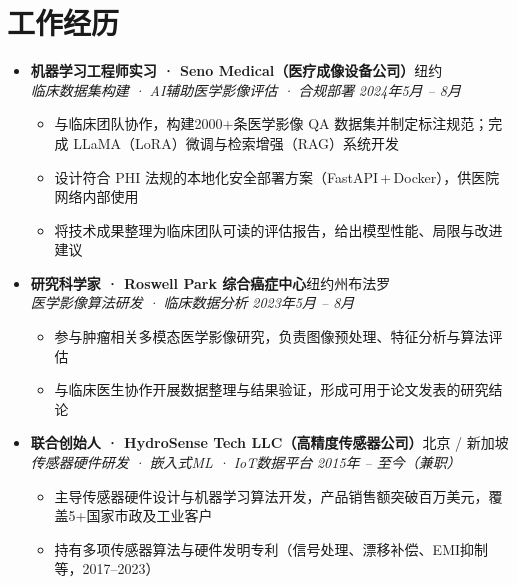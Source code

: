 \documentclass[letterpaper,10pt]{article}
\begin{document}
\vspace{-2pt}

\section{工作经历}

\begin{itemize}[leftmargin=0in, label={}]

  \item
  \textbf{机器学习工程师实习 · Seno Medical（医疗成像设备公司）}\hfill 纽约 \\
  \textit{临床数据集构建 · AI辅助医学影像评估 · 合规部署} \hfill \textit{2024年5月 -- 8月}
  \begin{itemize}[leftmargin=0.2in, topsep=1pt]
    \item 与临床团队协作，构建2000+条医学影像 QA 数据集并制定标注规范；完成 LLaMA（LoRA）微调与检索增强（RAG）系统开发
    \item 设计符合 PHI 法规的本地化安全部署方案（FastAPI\,+\,Docker），供医院网络内部使用
    \item 将技术成果整理为临床团队可读的评估报告，给出模型性能、局限与改进建议
  \end{itemize}

  \vspace{3pt}

  \item
  \textbf{研究科学家 · Roswell Park 综合癌症中心}\hfill 纽约州布法罗 \\
  \textit{医学影像算法研发 · 临床数据分析} \hfill \textit{2023年5月 -- 8月}
  \begin{itemize}[leftmargin=0.2in, topsep=1pt]
    \item 参与肿瘤相关多模态医学影像研究，负责图像预处理、特征分析与算法评估
    \item 与临床医生协作开展数据整理与结果验证，形成可用于论文发表的研究结论
  \end{itemize}

  \vspace{3pt}

  \item
  \textbf{联合创始人 · HydroSense Tech LLC（高精度传感器公司）}\hfill 北京 / 新加坡 \\
  \textit{传感器硬件研发 · 嵌入式ML · IoT数据平台} \hfill \textit{2015年 -- 至今（兼职）}
  \begin{itemize}[leftmargin=0.2in, topsep=1pt]
    \item 主导传感器硬件设计与机器学习算法开发，产品销售额突破百万美元，覆盖5+国家市政及工业客户
    \item 持有多项传感器算法与硬件发明专利（信号处理、漂移补偿、EMI抑制等，2017--2023）
  \end{itemize}

\end{itemize}
\end{document}
